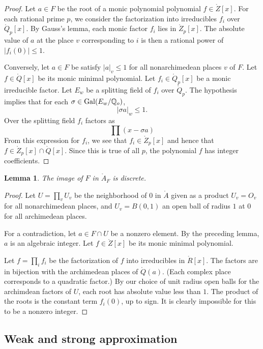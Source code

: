 \documentclass{amsart}
\newtheorem{lemma}[equation]{Lemma}
\def\abs#1{{|#1|}}
\def\ZZ{\ring{Z}}
\def\QQ{\ring{Q}}
\def\AA{\ring{A}}
\def\oG{\op{Gal}}
\begin{document}
\begin{proof} Let $a\in F$ be the root of a monic polynomial
  polynomial $f\in \ZZ[x]$.  For each rational prime $p$, we consider
  the factorization into irreducibles $f_i$ over $\QQ_p[x]$.  By
  Gauss's lemma, each monic factor $f_i$ lies in $\ZZ_p[x]$.  The
  absolute value of $a$ at the place $v$ corresponding to $i$ is then
  a rational power of $|f_i(0)|\le 1$.

Conversely, let $a\in F$ be satisfy $|a|_v\le 1$ for all
nonarchimedean places $v$ of $F$.  Let $f\in \QQ[x]$ be its monic
minimal polynomial.  Let $f_i\in \QQ_p[x]$ be a monic irreducible
factor.  Let $E_w$ be a splitting field of $f_i$ over $\QQ_p$.  The
hypothesis implies that for each $\sigma\in \oG(E_w/\QQ_o)$,
\[
\abs{\sigma a}_w\le 1.
\]
Over the splitting field $f_i$ factors as 
\[
\prod (x - \sigma a)
\]
From this expression for $f_i$, we see that $f_i\in \ZZ_p[x]$ and
hence that $f\in \ZZ_p[x]\cap \QQ[x]$.  Since this is true of all $p$,
the polynomial $f$ has integer coefficients.
\end{proof}

\begin{lemma} The image of $F$ in $\AA_F$ is discrete.
\end{lemma}

\begin{proof} Let $U=\prod_v U_v$ be the neighborhood of $0$ in $\AA$
  given as a product $U_v = O_v$ for all nonarchimedean places, and
  $U_v = B(0,1)$ an open ball of radius $1$ at $0$ for all archimedean
  places.  

  For a contradiction, let $a \in F\cap U$ be a nonzero element.  
  By the preceding lemma, $a$ is an
  algebraic integer.  Let $f\in \ring{Z}[x]$ be its monic minimal polynomial.

  Let $f = \prod_i f_i$ be the factorization of $f$ into irreducibles
  in $\ring{R}[x]$.  The factors are in bijection with the archimedean
  places of $\QQ(a)$.  (Each complex place corresponds to a quadratic
  factor.)  By our choice of unit radius open balls for the archimdean
  factors of $U$, each root has absolute value less
  than $1$.  The product of the roots is the constant term $f_i(0)$,
  up to sign.  It is clearly impossible for this to be a nonzero integer.
\end{proof}

 \subsection{Weak and strong approximation}
\end{document}

